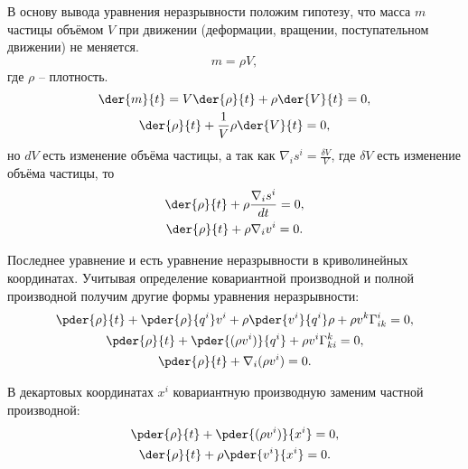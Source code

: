 
В основу вывода уравнения неразрывности положим гипотезу, что масса \( m \)
частицы объёмом \( V \) при движении (деформации, вращении, поступательном
движении) не меняется.
\[
    m = \rho V,
\]
где \( \rho \) -- плотность.
\begin{gather*}
    \der{m}{t} =V \der{\rho}{t}+ \rho \der{V}{t} = 0,\\
    \der{\rho}{t}+ \frac{1}{V} \rho \der{V}{t} = 0,
\end{gather*}
но \( dV \) есть изменение объёма частицы, а так как
\( \nabla_is^i = \frac{\delta V}{V} \), где \( \delta V \) есть изменение
объёма частицы, то
\begin{gather*}
    \der{\rho}{t}+ \rho \frac{\nabla_is^i}{dt} = 0, \\ 
    \der{\rho}{t}+ \rho {\nabla_iv^i} = 0.
\end{gather*}

Последнее уравнение и есть уравнение неразрывности в криволинейных координатах.
Учитывая определение ковариантной производной и полной производной получим
другие формы уравнения неразрывности:
\begin{gather*}
    \pder{\rho}{t} + 
    \pder{\rho}{q^i} v^i + 
    \rho \pder{v^i}{q^i} \rho  + 
    \rho v^k \Gamma^i_{ik} = 0, \\
    \pder{\rho}{t} + 
    \pder{(\rho v^i)}{q^i}   + 
    \rho v^i \Gamma^k_{ki} = 0, \\
    \pder{\rho}{t} + 
    \nabla_i(\rho v^i) = 0.
\end{gather*}

В декартовых координатах \( x^i \) ковариантную производную заменим
частной производной:
\begin{gather*}
    \pder{\rho}{t} + 
    \pder{(\rho v^i)}{x^i} = 0, \\
    \der{\rho}{t} + 
    \rho\pder{v^i}{x^i} = 0.
\end{gather*}       


\newpage
